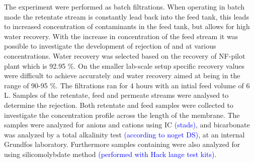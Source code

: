 The experiment were performed as batch filtrations.
When operating in batch mode the retentate stream is constantly lead back into the feed tank, this leads to increased concentration of contaminants in the feed tank, but allows for high water recovery. 
With the increase in concentration of the feed stream it was possible to investigate the development of rejection of  and  at various concentrations.
Water recovery was selected based on the recovery of NF-pilot plant which is 92.95 \%.
On the smaller lab-scale setup specific recovery values were difficult to achieve accurately and  water recovery aimed at being in the range of 90-95 \%.
The filtrations ran for 4 hours with an intial feed volume of 6 L.
Samples of the retentate, feed and permeate streams were analysed to determine the rejection. 
Both retentate and feed samples were collected to investigate the concentration profile across the length of the membrane. 
The samples were analyzed for anions and cations using IC \textcolor{blue}{(stads)}, and bicarbonate was analyzed by a total alkalinity test \textcolor{blue}{(according to noget DS)}, at an internal Grundfos laboratory.                                     
Furthermore samples containing  were also analyzed for  using silicomolybdate method \textcolor{blue}{(performed with Hack lange test kits)}. 



   






